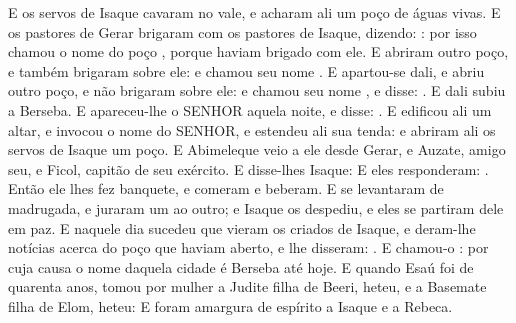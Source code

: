 {{E os servos de Isaque cavaram no vale, e acharam ali um poço de águas vivas.
E os pastores de Gerar brigaram com os pastores de Isaque, dizendo: : por isso chamou o nome do poço , porque haviam brigado com ele.
E abriram outro poço, e também brigaram sobre ele: e chamou seu nome .
E apartou-se dali, e abriu outro poço, e não brigaram sobre ele: e chamou seu nome , e disse: .
E dali subiu a Berseba.
E apareceu-lhe o SENHOR aquela noite, e disse: .
E edificou ali um altar, e invocou o nome do SENHOR, e estendeu ali sua tenda: e abriram ali os servos de Isaque um poço.
E Abimeleque veio a ele desde Gerar, e Auzate, amigo seu, e Ficol, capitão de seu exército.
E disse-lhes Isaque: 
E eles responderam: . %
Então ele lhes fez banquete, e comeram e beberam.
E se levantaram de madrugada, e juraram um ao outro; e Isaque os despediu, e eles se partiram dele em paz.
E naquele dia sucedeu que vieram os criados de Isaque, e deram-lhe notícias acerca do poço que haviam aberto, e lhe disseram: .
E chamou-o : por cuja causa o nome daquela cidade é Berseba até hoje.
E quando Esaú foi de quarenta anos, tomou por mulher a Judite filha de Beeri, heteu, e a Basemate filha de Elom, heteu: %
E foram amargura de espírito a Isaque e a Rebeca.

\par}

}
